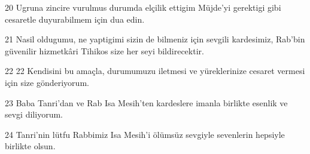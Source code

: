 \par 20 Ugruna zincire vurulmus durumda elçilik ettigim Müjde'yi gerektigi gibi cesaretle duyurabilmem için dua edin.
\par 21 Nasil oldugumu, ne yaptigimi sizin de bilmeniz için sevgili kardesimiz, Rab'bin güvenilir hizmetkâri Tihikos size her seyi bildirecektir.
\par 22 22 Kendisini bu amaçla, durumumuzu iletmesi ve yüreklerinize cesaret vermesi için size gönderiyorum.
\par 23 Baba Tanri'dan ve Rab Isa Mesih'ten kardeslere imanla birlikte esenlik ve sevgi diliyorum.
\par 24 Tanri'nin lütfu Rabbimiz Isa Mesih'i ölümsüz sevgiyle sevenlerin hepsiyle birlikte olsun.


